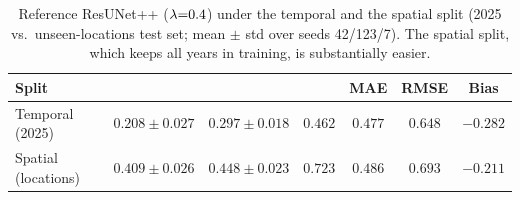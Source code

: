 \begin{table}[t]
  \centering
  \caption{Reference ResUNet++ ($\lambda{=}0.4$) under the temporal and the
  spatial split (2025 vs.\ unseen-locations test set; mean $\pm$ std over seeds
  42/123/7). The spatial split, which keeps all years in training, is
  substantially easier.}
  \label{tab:spatial}
  \small
  \begin{tabular}{lcccccc}
    \toprule
    Split & \Rsq{} & \SPAEF{} & \MSPAEF{} & MAE & RMSE & Bias \\
    \midrule
    Temporal (2025)      & $0.208\pm0.027$ & $0.297\pm0.018$ & $0.462$ & $0.477$ & $0.648$ & $-0.282$ \\
    Spatial (locations)  & $0.409\pm0.026$ & $0.448\pm0.023$ & $0.723$ & $0.486$ & $0.693$ & $-0.211$ \\
    \bottomrule
  \end{tabular}
\end{table}
